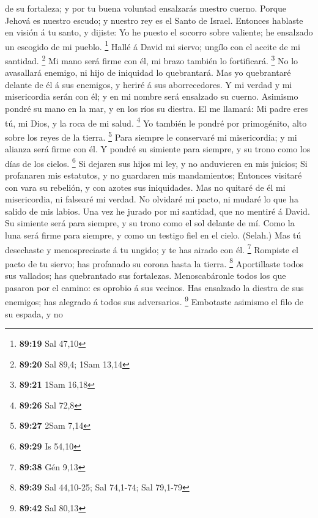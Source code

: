 de su fortaleza; y por tu buena voluntad ensalzarás nuestro cuerno.
 Porque Jehová es nuestro escudo; y nuestro rey es el Santo
de Israel.  Entonces hablaste en visión á tu santo, y
dijiste: Yo he puesto el socorro sobre valiente; he ensalzado un
escogido de mi pueblo. \footnote{\textbf{89:19} Sal 47,10} 
Hallé á David mi siervo; ungílo con el aceite de mi santidad.
\footnote{\textbf{89:20} Sal 89,4; 1Sam 13,14}  Mi mano
será firme con él, mi brazo también lo fortificará. \footnote{\textbf{89:21}
  1Sam 16,18}  No lo avasallará enemigo, ni hijo de
iniquidad lo quebrantará.  Mas yo quebrantaré delante de él
á sus enemigos, y heriré á sus aborrecedores.  Y mi verdad
y mi misericordia serán con él; y en mi nombre será ensalzado su cuerno.
 Asimismo pondré su mano en la mar, y en los ríos su
diestra.  El me llamará: Mi padre eres tú, mi Dios, y la
roca de mi salud. \footnote{\textbf{89:26} Sal 72,8}  Yo
también le pondré por primogénito, alto sobre los reyes de la tierra.
\footnote{\textbf{89:27} 2Sam 7,14}  Para siempre le
conservaré mi misericordia; y mi alianza será firme con él.
 Y pondré su simiente para siempre, y su trono como los
días de los cielos. \footnote{\textbf{89:29} Is 54,10}  Si
dejaren sus hijos mi ley, y no anduvieren en mis juicios; 
Si profanaren mis estatutos, y no guardaren mis mandamientos;
 Entonces visitaré con vara su rebelión, y con azotes sus
iniquidades.  Mas no quitaré de él mi misericordia, ni
falsearé mi verdad.  No olvidaré mi pacto, ni mudaré lo que
ha salido de mis labios.  Una vez he jurado por mi
santidad, que no mentiré á David.  Su simiente será para
siempre, y su trono como el sol delante de mí.  Como la
luna será firme para siempre, y como un testigo fiel en el cielo.
(Selah.)  Mas tú desechaste y menospreciaste á tu ungido; y
te has airado con él. \footnote{\textbf{89:38} Gén 9,13} 
Rompiste el pacto de tu siervo; has profanado su corona hasta la tierra.
\footnote{\textbf{89:39} Sal 44,10-25; Sal 74,1-74; Sal 79,1-79}
 Aportillaste todos sus vallados; has quebrantado sus
fortalezas.  Menoscabáronle todos los que pasaron por el
camino: es oprobio á sus vecinos.  Has ensalzado la diestra
de sus enemigos; has alegrado á todos sus adversarios. \footnote{\textbf{89:42}
  Sal 80,13}  Embotaste asimismo el filo de su espada, y no
